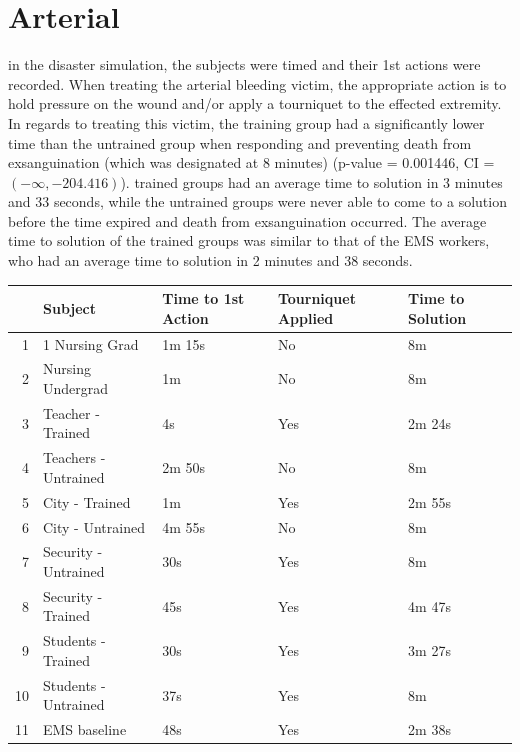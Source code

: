 \documentclass{article}
\begin{document}
\section{Arterial}
in the disaster simulation, the subjects were timed and their 1st actions were recorded. When 
treating the arterial bleeding victim, the appropriate action is to hold pressure on the wound 
and/or apply a tourniquet to the effected extremity. In regards to treating this victim, the 
training group had a significantly lower time than the untrained group when responding and 
preventing death from exsanguination (which was designated at 8 minutes) (p-value = 0.001446, CI = $(-\infty, -204.416)$). 
trained groups had an average time to solution in 3 minutes and 33 seconds, while the untrained 
groups were never able to come to a solution before the time expired and death from exsanguination 
occurred. The average time to solution of the trained groups was similar to that of the EMS 
workers, who had an average time to solution in 2 minutes and 38 seconds. 
\begin{table}[ht]
\centering
\begin{tabular}{rllll}
  \hline
 & Subject & Time to 1st Action & Tourniquet Applied  & Time to Solution \\
  \hline
1 & 1 Nursing Grad & 1m 15s & No & 8m \\
  2 & Nursing Undergrad & 1m &  No & 8m \\
  3 & Teacher - Trained & 4s & Yes & 2m 24s \\
  4 & Teachers - Untrained & 2m 50s & No & 8m \\
  5 & City - Trained & 1m & Yes & 2m 55s \\
  6 & City - Untrained & 4m 55s & No & 8m \\
  7 & Security - Untrained & 30s & Yes & 8m \\
  8 & Security - Trained & 45s & Yes & 4m 47s \\
  9 & Students - Trained & 30s & Yes & 3m 27s \\
  10 & Students - Untrained & 37s & Yes & 8m \\
  11 &  EMS baseline & 48s & Yes & 2m 38s \\
   \hline
\end{tabular}
\end{table}
\end{document}
